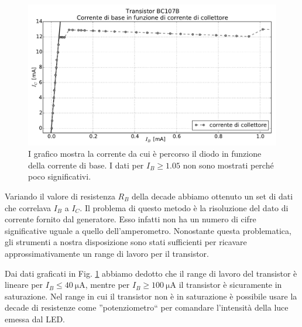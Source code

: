 \begin{figure}
	\includegraphics[width=120mm]{saturazione.pdf}
	\caption{I grafico mostra la corrente da cui è percorso il diodo in funzione della corrente di base. I dati per $I_B \geq 1.05$ non sono mostrati perché poco significativi.}
	\label{fig:saturazione}
\end{figure}

Variando il valore di resistenza $R_B$ della decade abbiamo ottenuto un set di dati che correlava $I_B$ a $I_C$.
Il problema di questo metodo è la risoluzione del dato di corrente fornito dal generatore.
Esso infatti non ha un numero di cifre significative uguale a quello dell'amperometro.
Nonostante questa problematica, gli strumenti a nostra disposizione sono stati sufficienti per ricavare approssimativamente un range di lavoro per il transistor.



Dai dati graficati in Fig. \ref{fig:saturazione} abbiamo dedotto che il range di lavoro del transistor è lineare per $I_B \leq \SI{40}{\micro\ampere}$, mentre per $I_B \geq \SI{100}{\micro\ampere}$ il transistor è sicuramente in saturazione. Nel range in cui il transistor non è in saturazione è possibile usare la decade di resistenze come ''potenziometro`` per comandare l'intensità della luce emessa dal LED.

